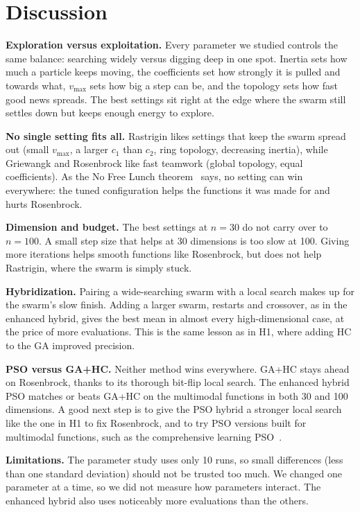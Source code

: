 \documentclass[conference]{IEEEtran}
\begin{document}
\FloatBarrier
\section{Discussion}\label{sec:discussion}
\textbf{Exploration versus exploitation.} Every parameter we studied
controls the same balance: searching widely versus digging deep in one
spot. Inertia sets how much a particle keeps moving, the coefficients set
how strongly it is pulled and towards what, $v_{\max}$ sets how big a step
can be, and the topology sets how fast good news spreads. The best settings
sit right at the edge where the swarm still settles down but keeps enough
energy to explore.

\textbf{No single setting fits all.} Rastrigin likes settings that keep the
swarm spread out (small $v_{\max}$, a larger $c_1$ than $c_2$, ring
topology, decreasing inertia), while Griewangk and Rosenbrock like fast
teamwork (global topology, equal coefficients). As the No Free Lunch
theorem~\cite{wolpert1997} says, no setting can win everywhere: the tuned
configuration helps the functions it was made for and hurts Rosenbrock.

\textbf{Dimension and budget.} The best settings at $n=30$ do not carry
over to $n=100$. A small step size that helps at 30 dimensions is too slow
at 100. Giving more iterations helps smooth functions like Rosenbrock, but
does not help Rastrigin, where the swarm is simply stuck.

\textbf{Hybridization.} Pairing a wide-searching swarm with a local
search makes up for the swarm's slow finish. Adding a larger swarm,
restarts and crossover, as in the enhanced hybrid, gives the best mean in
almost every high-dimensional case, at the price of more evaluations. This
is the same lesson as in H1, where adding HC to the GA improved precision.

\textbf{PSO versus GA+HC.} Neither method wins everywhere. GA+HC stays
ahead on Rosenbrock, thanks to its thorough bit-flip local search. The
enhanced hybrid PSO matches or beats GA+HC on the multimodal functions in
both 30 and 100 dimensions. A good next step is to give the PSO hybrid a
stronger local search like the one in H1 to fix Rosenbrock, and to try PSO
versions built for multimodal functions, such as the comprehensive learning
PSO~\cite{liang2006}.

\textbf{Limitations.} The parameter study uses only 10 runs, so small
differences (less than one standard deviation) should not be trusted too
much. We changed one parameter at a time, so we did not measure how
parameters interact. The enhanced hybrid also uses noticeably more
evaluations than the others.
\end{document}
